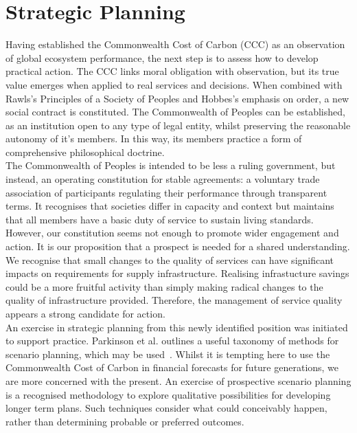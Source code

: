 \section{Strategic Planning}

Having established the Commonwealth Cost of Carbon (CCC) as an observation of global ecosystem performance, the next step is to assess how to develop practical action.
The CCC links moral obligation with observation, but its true value emerges when applied to real services and decisions.
When combined with Rawls’s Principles of a Society of Peoples and Hobbes’s emphasis on order, a new social contract is constituted.
The Commonwealth of Peoples can be established, as an institution open to any type of legal entity, whilst preserving the reasonable autonomy of it's members.
In this way, its members practice a form of comprehensive philosophical doctrine.\\

The Commonwealth of Peoples is intended to be less a ruling government, but instead, an operating constitution for stable agreements: a voluntary trade association of participants regulating their performance through transparent terms.
It recognises that societies differ in capacity and context but maintains that all members have a basic duty of service to sustain living standards.\\

However, our constitution seems not enough to promote wider engagement and action.
It is our proposition that a prospect is needed for a shared understanding.
We recognise that small changes to the quality of services can have significant impacts on requirements for supply infrastructure.
Realising infrastucture savings could be a more fruitful activity than simply making radical changes to the quality of infrastructure provided.
Therefore, the management of service quality appears a strong candidate for action.\\

An exercise in strategic planning from this newly identified position was initiated to support practice.
Parkinson et al. outlines a useful taxonomy of methods for scenario planning, which may be used~\cite{atp1}.
Whilst it is tempting here to use the Commonwealth Cost of Carbon in financial forecasts for future generations, we are more concerned with the present.
An exercise of prospective scenario planning is a recognised methodology to explore qualitative possibilities for developing longer term plans.
Such techniques consider what could conceivably happen, rather than determining probable or preferred outcomes.\\

